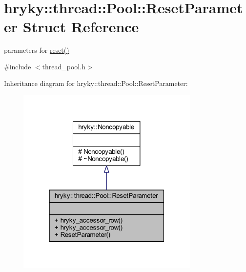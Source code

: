 \hypertarget{structhryky_1_1thread_1_1_pool_1_1_reset_parameter}{\section{hryky\-:\-:thread\-:\-:Pool\-:\-:Reset\-Parameter Struct Reference}
\label{structhryky_1_1thread_1_1_pool_1_1_reset_parameter}
}


parameters for \hyperlink{classhryky_1_1thread_1_1_pool_a7060b7e3c556334ec71aa2b42401231f}{reset()}  




{\ttfamily \#include $<$thread\-\_\-pool.\-h$>$}



Inheritance diagram for hryky\-:\-:thread\-:\-:Pool\-:\-:Reset\-Parameter\-:\nopagebreak
\begin{figure}[H]
\begin{center}
\leavevmode
\includegraphics[width=256pt]{structhryky_1_1thread_1_1_pool_1_1_reset_parameter__inherit__graph}
\end{center}
\end{figure}
